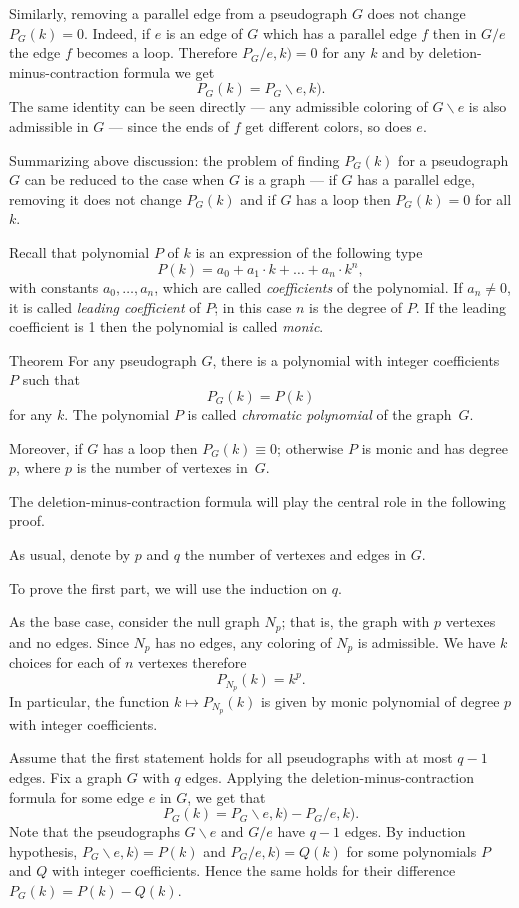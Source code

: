 Similarly, removing a parallel edge from a pseudograph $G$ does not change $P_G(k)=0$.
Indeed, if $e$ is an edge of $G$ which has a parallel edge $f$ then in $G/e$ the edge $f$ becomes a loop.
Therefore $P_G/e,k)=0$ for any $k$ and by deletion-minus-contraction formula we get 
\[P_G(k)=P_G\backslash e,k).\]
The same identity can be seen directly --- any admissible coloring of $G\backslash e$ is also admissible in $G$ --- since the ends of $f$ get different colors, so does $e$. 

Summarizing above discussion:
the problem of finding $P_G(k)$ for a pseudograph $G$ can be reduced to the case when $G$ is a graph --- if $G$ has a parallel edge, removing it does not change $P_G(k)$ and if $G$ has a loop then $P_G(k)=0$ for all $k$.

Recall that polynomial $P$ of $k$ is an expression of the following type
\[P(k)=a_0+a_1\cdot k+\dots+a_n\cdot k^n,\]
with constants $a_0,\dots, a_n$, which are called \emph{coefficients} of the polynomial.
If $a_n\ne 0$, it is called \emph{leading coefficient} of $P$;
in this case $n$ is the degree of $P$.
If the leading coefficient is 1 then the polynomial is called \emph{monic}.

\begin{thm}{Theorem}\label{thm:chromatic-polynomial}
For any pseudograph $G$, there is a polynomial with integer coefficients $P$ such that 
\[P_G(k)=P(k)\]
for any $k$.
The polynomial $P$ is called \emph{chromatic polynomial} of the graph~$G$.

Moreover, if $G$ has a loop then $P_G(k)\equiv 0$;
otherwise $P$ is monic and has degree $p$,
where $p$ is the number of vertexes in~$G$.
\end{thm}

The deletion-minus-contraction formula will play the central role in the following proof.

As usual, denote by $p$ and $q$ the number of vertexes and edges in $G$.

To prove the first part, we will use the induction on $q$.

As the base case, consider the null graph $N_p$; that is, the graph with $p$ vertexes and no edges.
Since $N_p$ has no edges, any coloring of $N_p$ is admissible.
We have $k$ choices for each of $n$ vertexes therefore
\[P_{N_p}(k)=k^p.\]
In particular, the function $k\mapsto P_{N_p}(k)$ is given by monic polynomial of degree $p$ with integer coefficients.

Assume that the first statement holds for all pseudographs with at most $q-1$ edges.
Fix a graph $G$ with $q$ edges. 
Applying the deletion-minus-contraction formula for some edge $e$ in $G$, we get that
\[P_G(k)=P_G\backslash e,k)-P_G/e,k).\]
Note that the pseudographs $G\backslash e$ and $G/e$ have $q-1$ edges.
By induction hypothesis, $P_G\backslash e,k)=P(k)$ and $P_G/e,k)=Q(k)$ for some polynomials $P$ and $Q$ with integer coefficients.
Hence the same holds for their difference $P_G(k)=P(k)-Q(k)$.

